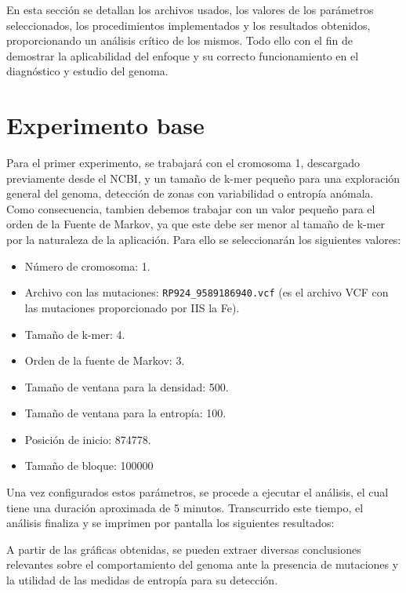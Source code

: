\documentclass[11pt,spanish,listoffigures,listoftables]{tfgetsinf}
\begin{document}
En esta sección se detallan los archivos usados, los valores de los parámetros seleccionados, los procedimientos implementados y los resultados obtenidos, proporcionando un análisis crítico de los mismos. Todo ello con el fin de demostrar la aplicabilidad del enfoque y su correcto funcionamiento en el diagnóstico y estudio del genoma.  

\section{Experimento base}

Para el primer experimento, se trabajará con el cromosoma 1, descargado previamente desde el \acs{NCBI}, y un tamaño de k-mer pequeño para una exploración general del genoma, detección de zonas con variabilidad o entropía anómala. Como consecuencia, tambien debemos trabajar con un valor pequeño para el orden de la Fuente de Markov, ya que este debe ser menor al tamaño de k-mer por la naturaleza de la aplicación. Para ello se seleccionarán los siguientes valores:


\begin{itemize}
   \item Número de cromosoma: 1.
   \item Archivo con las mutaciones: \texttt{RP924\_9589186940.vcf}  (es el archivo \acs{VCF} con las mutaciones proporcionado por \acs{IIS} la Fe).
   \item Tamaño de k-mer: 4.
   \item Orden de la fuente de Markov: 3.
   \item Tamaño de ventana para la densidad: 500.
   \item Tamaño de ventana para la entropía: 100.
   \item Posición de inicio: 874778.
   \item Tamaño de bloque: 100000 
\end{itemize}
 

Una vez configurados estos parámetros, se procede a ejecutar el análisis, el cual tiene una duración aproximada de 5 minutos. Transcurrido este tiempo, el análisis finaliza y se imprimen por pantalla los siguientes resultados:

A partir de las gráficas obtenidas, se pueden extraer diversas conclusiones relevantes sobre el comportamiento del genoma ante la presencia de mutaciones y la utilidad de las medidas de entropía para su detección.  
\end{document}

